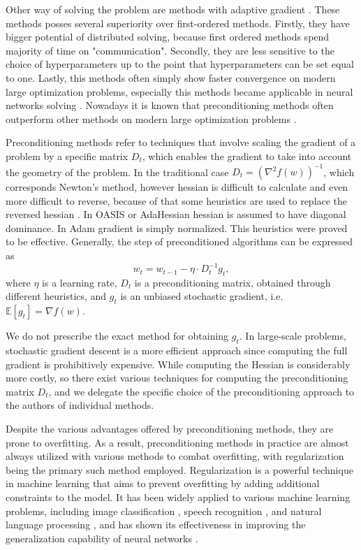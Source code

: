 \documentclass{article}
\begin{document}
Other way of solving the problem are methods with adaptive gradient \citep{hazan2007adaptive}. These methods posses several superiority over first-ordered methods.
Firstly, they have bigger potential of distributed solving, because first ordered methods spend majority of time on "communication".
Secondly, they are less sensitive to the choice of hyperparameters up to the point that hyperparameters can be set equal to one.
Lastly, this methods often simply show faster convergence on modern large optimization problems, especially this methods became applicable in neural networks solving \citep{kingma2014adam}.
Nowadays it is known that preconditioning methods often outperform other methods on modern large optimization problems \citep{goldberg2011oasis, kingma2014adam, zhang2018three, yao2021adahessian}.

Preconditioning methods refer to techniques that involve scaling the gradient of a problem by a specific matrix $D_t$, which enables the gradient to take into account the geometry of the problem. In the traditional case $D_t = (\nabla^2 f(w))^{-1}$, which corresponds Newton's method, however hessian is difficult to calculate and even more difficult to reverse, because of that some heuristics are used to replace the reversed hessian \citep{dennis1977quasi}. In OASIS \citep{jahani2021doubly} or AdaHessian \citep{yao2021adahessian} hessian is assumed to have diagonal dominance. In Adam \citep{kingma2014adam} gradient is simply normalized. This heuristics were proved to be effective. Generally, the step of preconditioned algorithms can be expressed as
\begin{equation}
    w_t = w_{t-1} - \eta \cdot D_t^{-1} g_t,
\end{equation}
where $\eta$ is a learning rate, $D_t$ is a preconditioning matrix, obtained through different heuristics, and $g_t$ is an unbiased stochastic gradient, i.e. $\mathbb{E}[g_t] = \nabla f(w)$.

We do not prescribe the exact method for obtaining $g_t$. In large-scale problems, stochastic gradient descent is a more efficient approach since computing the full gradient is prohibitively expensive.
While computing the Hessian is considerably more costly, so there exist various techniques for computing the preconditioning matrix $D_t$, and we delegate the specific choice of the preconditioning approach to the authors of individual methods.

Despite the various advantages offered by preconditioning methods, they are prone to overfitting. As a result, preconditioning methods in practice are almost always utilized with various methods to combat overfitting, with regularization being the primary such method employed.
Regularization is a powerful technique in machine learning that aims to prevent overfitting by adding additional constraints to the model.
It has been widely applied to various machine learning problems, including image classification \citep{zhu2017learning}, speech recognition \citep{zhou2017improved}, and natural language processing \citep{wu2022stgn}, and has shown its effectiveness in improving the generalization capability of neural networks \citep{girosi1995regularization}.
\end{document}
